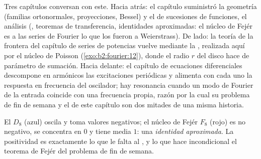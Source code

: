 \begin{remark}
Tres capítulos conversan con este. Hacia atrás: el capítulo
 suministró la geometría (familias ortonormales,
proyecciones, Bessel) y el de sucesiones de funciones, el análisis
(, teoremas de transferencia, identidades
aproximadas: el núcleo de Fejér es a las series de Fourier lo que
los  fueron a Weierstrass). De lado: la teoría
de la frontera del capítulo de series de potencias vuelve mediante la
, realizada aquí por el núcleo de Poisson
(\cref{exo:b2:fourier:12}), donde el radio $r$ del disco hace de
parámetro de sumación. Hacia delante: el capítulo de ecuaciones
diferenciales descompone en armónicos las excitaciones periódicas y
alimenta con cada uno la respuesta en frecuencia del oscilador; hay
resonancia cuando un modo de Fourier de la entrada coincide con una
frecuencia propia, razón por la cual su problema de fin de semana y
el de este capítulo son dos mitades de una misma historia.
\end{remark}

\begin{omfigure}

{\small El  $D_8$ (azul) oscila y toma valores
negativos; el núcleo de Fejér $F_8$ (rojo) es no negativo, se
concentra en $0$ y tiene media $1$: una \emph{identidad aproximada}.
La positividad es exactamente lo que le falta al
, y lo que hace incondicional el teorema de
Fejér del problema de fin de semana.}
\end{omfigure}

